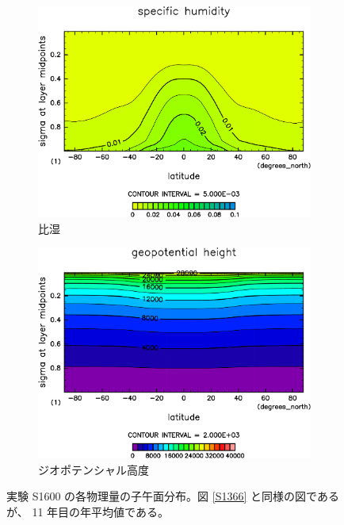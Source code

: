 \documentclass[body]{subfiles}
\begin{document}
\begin{figure}[t]
\begin{subfigure}{.4\textwidth}
		\includegraphics[width=\columnwidth]{S1600/QH2OVap,time=3650:4015-crop-rotate.pdf}
		\caption{比湿\hmu*{[kg/kg]}}\label{S1600比湿}
	\end{subfigure}
	\begin{subfigure}{.4\textwidth}
		\centering
		\includegraphics[width=\columnwidth]{S1600/Height,time=3650:4015-crop-rotate.pdf}
		\caption{ジオポテンシャル高度\hmu*{[m]}}\label{S1600ジオポテンシャル高度}
	\end{subfigure}
	\caption[実験 S1600 の各物理量の子午面分布]{
		実験 S1600 の各物理量の子午面分布。図 \ref{S1366} と同様の図であるが、
		11 年目の年平均値である。
	}\label{S1600}
\end{figure}
\end{document}
